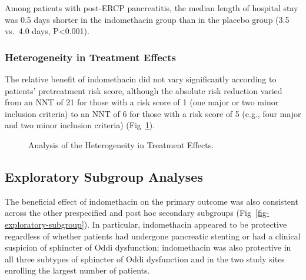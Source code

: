 \documentclass[
  10pt,
  letterpaper,
]{article}
\begin{document}
Among patients with post-ERCP pancreatitis, the median length of
hospital stay was 0.5 days shorter in the indomethacin group than in the
placebo group (3.5 vs.~4.0 days, P\textless0.001).

\subsubsection{Heterogeneity in Treatment
Effects}\label{heterogeneity-in-treatment-effects}

The relative benefit of indomethacin did not vary significantly
according to patients' pretreatment risk score, although the absolute
risk reduction varied from an NNT of 21 for those with a risk score of 1
(one major or two minor inclusion criteria) to an NNT of 6 for those
with a risk score of 5 (e.g., four major and two minor inclusion
criteria) (Fig~\ref{fig-heterogeneity}).

\begin{figure}


\caption{\label{fig-heterogeneity}Analysis of the Heterogeneity in
Treatment Effects.}

\end{figure}%

\subsection{Exploratory Subgroup
Analyses}\label{exploratory-subgroup-analyses}

The beneficial effect of indomethacin on the primary outcome was also
consistent across the other prespecified and post hoc secondary
subgroups (Fig~\ref{fig-exploratory-subgroup}). In particular,
indomethacin appeared to be protective regardless of whether patients
had undergone pancreatic stenting or had a clinical suspicion of
sphincter of Oddi dysfunction; indomethacin was also protective in all
three subtypes of sphincter of Oddi dysfunction and in the two study
sites enrolling the largest number of patients.
\end{document}
